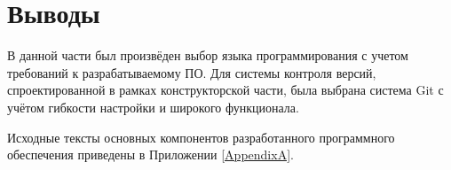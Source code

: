 \section{Выводы} \label{technologic_conclusion}

В данной части был произвёден выбор языка программирования с учетом требований к разрабатываемому ПО.
Для системы контроля версий, спроектированной в рамках конструкторской части, была выбрана система Git с учётом гибкости настройки и широкого функционала.

\vspace{\baselineskip}
Исходные тексты основных компонентов разработанного программного обеспечения приведены в Приложении \ref{AppendixA}.